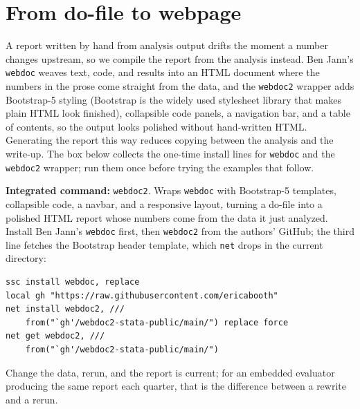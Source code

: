 \section{From do-file to webpage}
A report written by hand from analysis output drifts the moment a number changes upstream, so we compile the report from the analysis instead. Ben Jann's \texttt{webdoc} weaves text, code, and results into an HTML document where the numbers in the prose come straight from the data, and the \texttt{webdoc2} wrapper adds Bootstrap-5 styling (Bootstrap is the widely used stylesheet library that makes plain HTML look finished), collapsible code panels, a navigation bar, and a table of contents, so the output looks polished without hand-written HTML. Generating the report this way reduces copying between the analysis and the write-up. The box below collects the one-time install lines for \texttt{webdoc} and the \texttt{webdoc2} wrapper; run them once before trying the examples that follow.

\begin{kaobox}[frametitle=Package Integration: \texttt{webdoc2}]
\textbf{Integrated command:} \texttt{webdoc2}. Wraps \texttt{webdoc} with Bootstrap-5 templates, collapsible code, a navbar, and a responsive layout, turning a do-file into a polished HTML report whose numbers come from the data it just analyzed. Install Ben Jann's \texttt{webdoc} first, then \texttt{webdoc2} from the authors' GitHub; the third line fetches the Bootstrap header template, which \texttt{net} drops in the current directory:
\par
{\footnotesize
\begin{verbatim}
ssc install webdoc, replace
local gh "https://raw.githubusercontent.com/ericabooth"
net install webdoc2, ///
    from("`gh'/webdoc2-stata-public/main/") replace force
net get webdoc2, ///
    from("`gh'/webdoc2-stata-public/main/")
\end{verbatim}
}
\end{kaobox}

Change the data, rerun, and the report is current; for an embedded evaluator producing the same report each quarter, that is the difference between a rewrite and a rerun.

